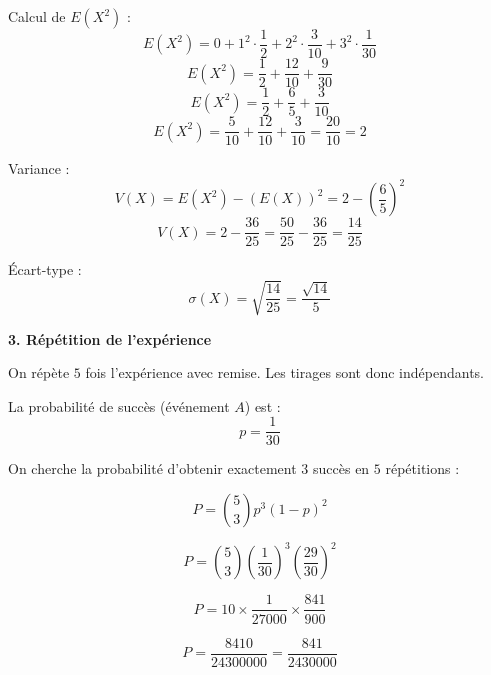 \documentclass[12pt,a4paper]{article}
\newcounter{correction}
\begin{document}
\begin{correction}
\medskip

Calcul de $E(X^2)$ :
\[
E(X^2) = 0 + 1^2 \cdot \frac{1}{2} + 2^2 \cdot \frac{3}{10} + 3^2 \cdot \frac{1}{30}
\]
\[
E(X^2) = \frac{1}{2} + \frac{12}{10} + \frac{9}{30}
\]
\[
E(X^2) = \frac{1}{2} + \frac{6}{5} + \frac{3}{10}
\]
\[
E(X^2) = \frac{5}{10} + \frac{12}{10} + \frac{3}{10} = \frac{20}{10} = 2
\]

\medskip

Variance :
\[
V(X) = E(X^2) - (E(X))^2 = 2 - \left(\frac{6}{5}\right)^2
\]
\[
V(X) = 2 - \frac{36}{25} = \frac{50}{25} - \frac{36}{25} = \frac{14}{25}
\]

\medskip

Écart-type :
\[
\sigma(X) = \sqrt{\frac{14}{25}} = \frac{\sqrt{14}}{5}
\]

\bigskip

\textbf{3. Répétition de l'expérience}

On répète $5$ fois l'expérience avec remise. Les tirages sont donc indépendants.

La probabilité de succès (événement $A$) est :
\[
p = \frac{1}{30}
\]

On cherche la probabilité d'obtenir exactement $3$ succès en $5$ répétitions :

\[
P = \binom{5}{3} p^3 (1-p)^2
\]

\[
P = \binom{5}{3} \left(\frac{1}{30}\right)^3 \left(\frac{29}{30}\right)^2
\]

\[
P = 10 \times \frac{1}{27000} \times \frac{841}{900}
\]

\[
P = \frac{8410}{24300000} = \frac{841}{2430000}
\]

\end{correction}
\end{document}
